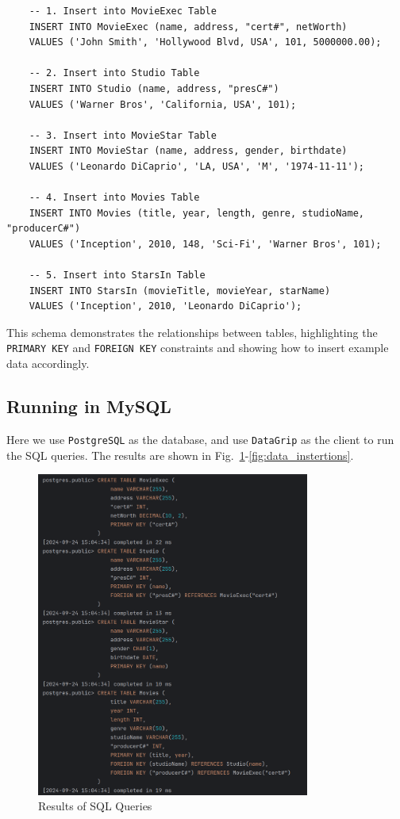 \documentclass{cshwk}
\begin{document}
\begin{verbatim}
    -- 1. Insert into MovieExec Table
    INSERT INTO MovieExec (name, address, "cert#", netWorth)
    VALUES ('John Smith', 'Hollywood Blvd, USA', 101, 5000000.00);
    
    -- 2. Insert into Studio Table
    INSERT INTO Studio (name, address, "presC#") 
    VALUES ('Warner Bros', 'California, USA', 101);
    
    -- 3. Insert into MovieStar Table
    INSERT INTO MovieStar (name, address, gender, birthdate)
    VALUES ('Leonardo DiCaprio', 'LA, USA', 'M', '1974-11-11');
    
    -- 4. Insert into Movies Table
    INSERT INTO Movies (title, year, length, genre, studioName, "producerC#")
    VALUES ('Inception', 2010, 148, 'Sci-Fi', 'Warner Bros', 101);
    
    -- 5. Insert into StarsIn Table
    INSERT INTO StarsIn (movieTitle, movieYear, starName)
    VALUES ('Inception', 2010, 'Leonardo DiCaprio');    
\end{verbatim}

This schema demonstrates the relationships between tables, highlighting the \texttt{PRIMARY KEY} and \texttt{FOREIGN KEY} constraints and showing how to insert example data accordingly.

\subsection*{Running in MySQL}

Here we use \texttt{PostgreSQL} as the database, and use \texttt{DataGrip} as the client to run the SQL queries.
The results are shown in Fig.~\ref{fig:table_create_1}-\ref{fig:data_instertions}.
\begin{figure}[H]
    \centering
    \includegraphics[width=0.8\textwidth]{hw2-3.png}
    \caption{Results of SQL Queries}
    \label{fig:table_create_1}
\end{figure}
\end{document}
